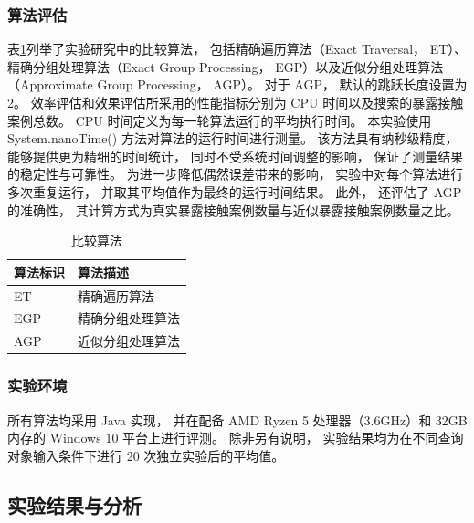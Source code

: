 \subsubsection*{算法评估}



表\ref{contact_tb:compared_alg}列举了实验研究中的比较算法， 包括精确遍历算法（Exact Traversal， ET）、精确分组处理算法（Exact Group Processing， EGP）以及近似分组处理算法（Approximate Group Processing， AGP）。
对于 AGP， 默认的跳跃长度设置为 2。
效率评估和效果评估所采用的性能指标分别为 CPU 时间以及搜索的暴露接触案例总数。
CPU 时间定义为每一轮算法运行的平均执行时间。 本实验使用 System.nanoTime() 方法对算法的运行时间进行测量。 该方法具有纳秒级精度， 能够提供更为精细的时间统计， 同时不受系统时间调整的影响， 保证了测量结果的稳定性与可靠性。 为进一步降低偶然误差带来的影响， 实验中对每个算法进行多次重复运行， 并取其平均值作为最终的运行时间结果。
此外， 还评估了 AGP 的准确性， 其计算方式为真实暴露接触案例数量与近似暴露接触案例数量之比。

\begin{table}[!ht]
    \caption{比较算法}\label{contact_tb:compared_alg}
    \begin{tabular}{ll}
        \toprule
		\bfseries 算法标识 & \bfseries 算法描述 \\
        \midrule
        ET & 精确遍历算法\\
        EGP & 精确分组处理算法 \\
        AGP & 近似分组处理算法 \\
        \bottomrule
    \end{tabular}
\end{table}

\subsubsection*{实验环境}

所有算法均采用 Java 实现， 并在配备 AMD Ryzen 5 处理器（3.6GHz）和 32GB 内存的 Windows 10 平台上进行评测。
除非另有说明， 实验结果均为在不同查询对象输入条件下进行 20 次独立实验后的平均值。


\subsection{实验结果与分析}

